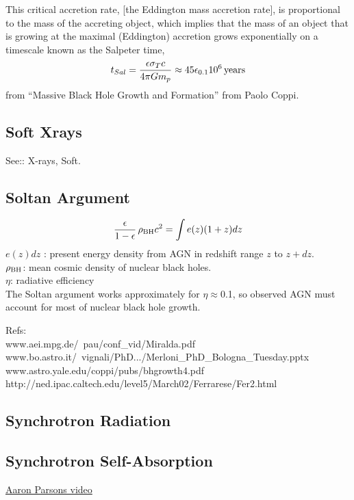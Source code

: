 \documentclass[11pt]{article}
\begin{document}
{This critical accretion rate, [the Eddington mass accretion rate], is proportional to the mass of the accreting object, which implies that the mass of an object that is growing at the maximal (Eddington) accretion grows exponentially on a timescale known as the Salpeter time,
\begin{equation}
  t_{Sal} = \frac{\epsilon \sigma_{T} c}{4\pi G m_{p}} \approx 45 \epsilon_{0.1} 10^6 \, {\rm years}
\end{equation}
from ``Massive Black Hole Growth and Formation'' from Paolo Coppi. 

\subsection*{Soft Xrays}
See:: X-rays, Soft. 

\subsection*{Soltan Argument}
\begin{equation}
  \frac{\epsilon}{1-\epsilon} \, \rho_{\rm BH} c^{2} = \int e(z) (1+z) dz
\end{equation}
$e(z) dz$ : present energy density from AGN in redshift range $z$ to $z+dz$.\\
$\rho_{\rm BH}$: mean cosmic density of nuclear black holes.\\
$\eta$: radiative efficiency\\
The Soltan argument works approximately for $\eta\approx$0.1, 
so observed AGN must account for most of nuclear black hole growth.

Refs:\\
www.aei.mpg.de/~pau/conf\_vid/Miralda.pdf\\
www.bo.astro.it/~vignali/PhD.../Merloni\_PhD\_Bologna\_Tuesday.pptx
www.astro.yale.edu/coppi/pubs/bhgrowth4.pdf
http://ned.ipac.caltech.edu/level5/March02/Ferrarese/Fer2.html

\subsection*{Synchrotron Radiation}

\subsection*{Synchrotron Self-Absorption}
\href{https://www.youtube.com/watch?v=HeuuX31Cyq0}{Aaron Parsons video}

}
\end{document}
